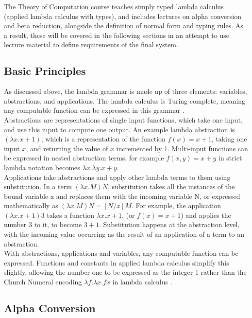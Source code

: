 \documentclass[a4paper,11pt]{report}
\begin{document}
The Theory of Computation course teaches simply typed lambda calculus (applied lambda calculus with types), and includes lectures on alpha conversion and beta reduction, alongside the definition of normal form and typing rules. As a result, these will be covered in the following sections in an attempt to use lecture material to define requirements of the final system.

\subsection{Basic Principles}

As discussed above, the lambda grammar is made up of three elements: variables, abstractions, and applications. The lambda calculus is Turing complete, meaning any computable function can be expressed in this grammar \cite{Rojas1998}.\\

Abstractions are representations of single input functions, which take one input, and use this input to compute one output. An example lambda abstraction is $(\lambda x.x+1)$, which is a representation of the function $f(x) = x+1$, taking one input $x$, and returning the value of $x$ incremented by 1. Multi-input functions can be expressed in nested abstraction terms, for example $f(x,y)=x+y$ in strict lambda notation becomes $\lambda x.\lambda y.x+y$.\\

Applications take abstractions and apply other lambda terms to them using substitution. In a term $(\lambda x.M)N$, substitution takes all the instances of the bound variable x and replaces them with the incoming variable N, or expressed mathematically as $(\lambda x.M)N=[N / x]M$.  For example, the application $(\lambda x.x+1)3$ takes a function $\lambda x.x+1$, (or $f(x)=x+1$) and applies the number 3 to it, to become $3+1$. Substitution happens at the abstraction level, with the incoming value occurring as the result of an application of a term to an abstraction.\\

With abstractions, applications and variables, any computable function can be expressed. Functions and constants in applied lambda calculus simplify this slightly, allowing the number one to be expressed as the integer 1 rather than the Church Numeral encoding $\lambda f.\lambda x.fx$ in lambda calculus \cite{Tarau2017}.

\subsection{Alpha Conversion}
\end{document}
